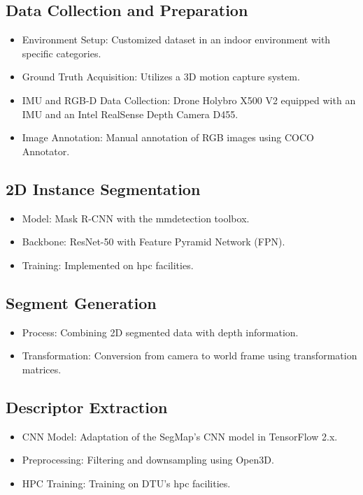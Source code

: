 \subsection{Data Collection and Preparation}

\begin{itemize}
    \item Environment Setup: Customized dataset in an indoor environment with specific categories.
    \item Ground Truth Acquisition: Utilizes a 3D motion capture system.
    \item IMU and RGB-D Data Collection: Drone Holybro X500 V2 equipped with an IMU and an Intel RealSense Depth Camera D455.
    \item Image Annotation: Manual annotation of RGB images using COCO Annotator\cite{cocoannotator}.
\end{itemize}

\subsection{2D Instance Segmentation}

\begin{itemize}
    \item Model: Mask R-CNN\cite{he2018mask} with the mmdetection toolbox\cite{mmdetection}.
    \item Backbone: ResNet-50 with Feature Pyramid Network (FPN)\cite{he2018mask}.
    \item Training: Implemented on \acrfull{hpc} facilities.
\end{itemize}

\subsection{Segment Generation}
\begin{itemize}
    \item Process: Combining 2D segmented data with depth information.
    \item Transformation: Conversion from camera to world frame using transformation matrices.
\end{itemize}

\subsection{Descriptor Extraction}
\begin{itemize}
    \item CNN Model: Adaptation of the SegMap's CNN model\cite{segmmappy} in TensorFlow 2.x.
    \item Preprocessing: Filtering and downsampling using Open3D.
    \item HPC Training: Training on DTU's \acrshort{hpc} facilities.
\end{itemize}

